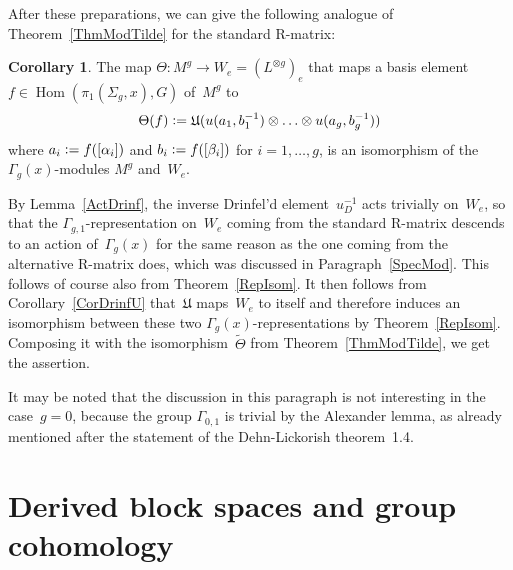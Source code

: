 \documentclass[12pt]{article}
\makeatletter
\theoremstyle{definition}
\newtheorem{Cor}[Satz]{Corollary}
\theoremstyle{break}
\renewenvironment{proof}[1][\proofname]{\par
\vspace{-5pt}%
\pushQED{\qed}%
\normalfont
\topsep0pt \partopsep0pt %
\trivlist
\item[\hskip\labelsep
\bfseries
#1\@addpunct{.}]\ignorespaces
}{%
\popQED\endtrivlist\@endpefalse
\addvspace{6pt plus 6pt} %
}
\DeclareMathOperator\Hom{Hom}
\newcommand{\fU}{\mathfrak{U}}
\renewcommand{\1}{\mathbbm{1}}
\newcommand{\ot}{\mathbin{\otimes}}
\newcommand{\uu}{u}
\newcommand{\deq}{\vcentcolon =}
\makeatother
\begin{document}
After these preparations, we can give the following analogue of Theorem~\ref{ThmModTilde} for the standard R-matrix:
\begin{Cor} \label{CorMod}
The map
$\Theta \colon M^g \to W_e = (L^{\ot g})_e$ that maps a basis element
\mbox{$f \in \Hom(\pi_1(\Sigma_{g},x),G)$} of~$M^g$ to
\[\Theta(f) \deq \fU(\uu(a_1,b_1^{-1}) \ot \dots \ot \uu(a_g,b_g^{-1}))\]
where $a_i \deq f([\alpha_i])$ and $b_i \deq f([\beta_i])$ for $i=1,\ldots,g$, is an isomorphism of the \mbox{$\Gamma_{g}(x)$-modules} $M^g$ and~$W_e$.
\end{Cor}
\begin{proof}
By Lemma~\ref{ActDrinf}, the inverse Drinfel'd element~$u_D^{-1}$ acts trivially on~$W_e$, so that the $\Gamma_{g,1}$-representation on~$W_e$ coming from the standard R-matrix descends to an action of~$\Gamma_{g}(x)$ for the same reason as the one coming from the alternative \mbox{R-matrix} does, which was discussed in Paragraph~\ref{SpecMod}. This follows of course also from Theorem~\ref{RepIsom}.
It then follows from Corollary~\ref{CorDrinfU} that~$\fU$ maps~$W_e$ to itself and therefore induces an isomorphism between these two $\Gamma_{g}(x)$-representations by Theorem~\ref{RepIsom}. Composing it with the isomorphism~$\tilde{\Theta}$ from Theorem~\ref{ThmModTilde}, we get the assertion.
\end{proof}

It may be noted that the discussion in this paragraph is not interesting in the case~\mbox{$g=0$}, because the group $\Gamma_{0,1}$ is trivial by the Alexander lemma, as already mentioned after the statement of the Dehn-Lickorish theorem~1.4.


\section{Derived block spaces and group cohomology} \label{Sec:DerBlCoh}
\end{document}
